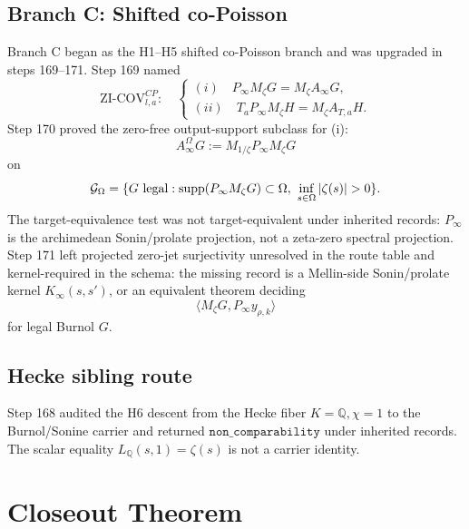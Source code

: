 \documentclass[11pt]{article}
\begin{document}
\subsection*{Branch C: Shifted co-Poisson}

Branch C began as the H1--H5 shifted co-Poisson branch and was upgraded in steps 169--171. Step 169 named
\[
\mathrm{ZI\text{-}COV}_{l,a}^{CP}:
\quad
\begin{cases}
(i)\quad P_\infty M_\zeta G=M_\zeta A_\infty G,\\
(ii)\quad T_aP_\infty M_\zeta H=M_\zeta A_{T,a}H.
\end{cases}
\]
Step 170 proved the zero-free output-support subclass for (i):
\[
A_\infty^\Omega G:=M_{1/\zeta}P_\infty M_\zeta G
\]
on
\[
\mathcal G_\Omega=\{G\ {\rm legal}:\operatorname{supp}(P_\infty M_\zeta G)\subset\Omega,\ 
\inf_{s\in\Omega}|\zeta(s)|>0\}.
\]
The target-equivalence test was not target-equivalent under inherited records: \(P_\infty\) is the archimedean Sonin/prolate projection, not a zeta-zero spectral projection. Step 171 left projected zero-jet surjectivity unresolved in the route table and kernel-required in the schema: the missing record is a Mellin-side Sonin/prolate kernel \(K_\infty(s,s')\), or an equivalent theorem deciding
\[
\langle M_\zeta G,P_\infty y_{\rho,k}\rangle
\]
for legal Burnol \(G\).

\subsection*{Hecke sibling route}

Step 168 audited the H6 descent from the Hecke fiber \(K=\mathbb Q,\chi=1\) to the Burnol/Sonine carrier and returned \(\texttt{non\_comparability}\) under inherited records. The scalar equality \(L_{\mathbb Q}(s,1)=\zeta(s)\) is not a carrier identity.

\section{Closeout Theorem}
\end{document}

